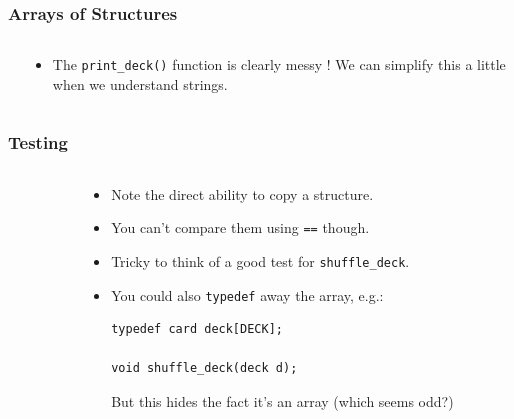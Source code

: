 \begin{frame}[fragile]
\frametitle{Arrays of Structures}
\begin{columns}

\begin{column}{0.45\textwidth}

\end{column}

\begin{column}{0.45\textwidth}
\begin{itemize}
\item The \verb^print_deck()^ function is clearly messy ! We can simplify this a little when we understand strings.
\end{itemize}
\end{column}

\end{columns}
\end{frame}

\begin{frame}[fragile]
\frametitle{Testing}
\begin{columns}

\begin{column}{0.50\textwidth}

\end{column}

\begin{column}{0.45\textwidth}
\begin{itemize}
\item Note the direct ability to copy a structure.
\item You can't compare them using \verb^==^ though.
\item Tricky to think of a good test for \verb^shuffle_deck^.
\item You could also \verb^typedef^ away the array, e.g.:
\begin{verbatim}
typedef card deck[DECK];

void shuffle_deck(deck d);
\end{verbatim}
But this hides the fact it's an array (which seems odd?)
\end{itemize}
\end{column}

\end{columns}
\end{frame}
